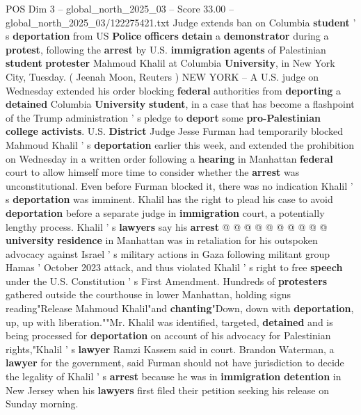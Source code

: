 \begin{textsample}{POS Dim 3 – global\_north\_2025\_03 – Score 33.00 – global\_north\_2025\_03/122275421.txt}  \label{ex:f3_pos_028}
Judge extends ban on Columbia \textbf{student} ' s \textbf{deportation} from US \textbf{Police} \textbf{officers} \textbf{detain} a \textbf{demonstrator} during a \textbf{protest}, following the \textbf{arrest} by U.S. \textbf{immigration} \textbf{agents} of Palestinian \textbf{student} \textbf{protester} Mahmoud Khalil at Columbia \textbf{University}, in New York City, Tuesday. ( Jeenah Moon, Reuters ) NEW YORK -- A U.S. judge on Wednesday extended his order blocking \textbf{federal} authorities from \textbf{deporting} a \textbf{detained} Columbia \textbf{University} \textbf{student}, in a case that has become a flashpoint of the Trump administration ' s pledge to \textbf{deport} some \textbf{pro-Palestinian} \textbf{college} \textbf{activists}.
U.S. \textbf{District} Judge Jesse Furman had temporarily blocked Mahmoud Khalil ' s \textbf{deportation} earlier this week, and extended the prohibition on Wednesday in a written order following a \textbf{hearing} in Manhattan \textbf{federal} court to allow himself more time to consider whether the \textbf{arrest} was unconstitutional.
Even before Furman blocked it, there was no indication Khalil ' s \textbf{deportation} was imminent.
Khalil has the right to plead his case to avoid \textbf{deportation} before a separate judge in \textbf{immigration} court, a potentially lengthy process.
Khalil ' s \textbf{lawyers} say his \textbf{arrest} @ @ @ @ @ @ @ @ @ @ \textbf{university} \textbf{residence} in Manhattan was in retaliation for his outspoken advocacy against Israel ' s military actions in Gaza following militant group Hamas ' October 2023 attack, and thus violated Khalil ' s right to free \textbf{speech} under the U.S.
Constitution ' s First Amendment.
Hundreds of \textbf{protesters} gathered outside the courthouse in lower Manhattan, holding signs reading"Release Mahmoud Khalil"and \textbf{chanting}"Down, down with \textbf{deportation}, up, up with liberation.""Mr.
Khalil was identified, targeted, \textbf{detained} and is being processed for \textbf{deportation} on account of his advocacy for Palestinian rights,"Khalil ' s \textbf{lawyer} Ramzi Kassem said in court.
Brandon Waterman, a \textbf{lawyer} for the government, said Furman should not have jurisdiction to decide the legality of Khalil ' s \textbf{arrest} because he was in \textbf{immigration} \textbf{detention} in New Jersey when his \textbf{lawyers} first filed their petition seeking his release on Sunday morning.

\end{textsample}
